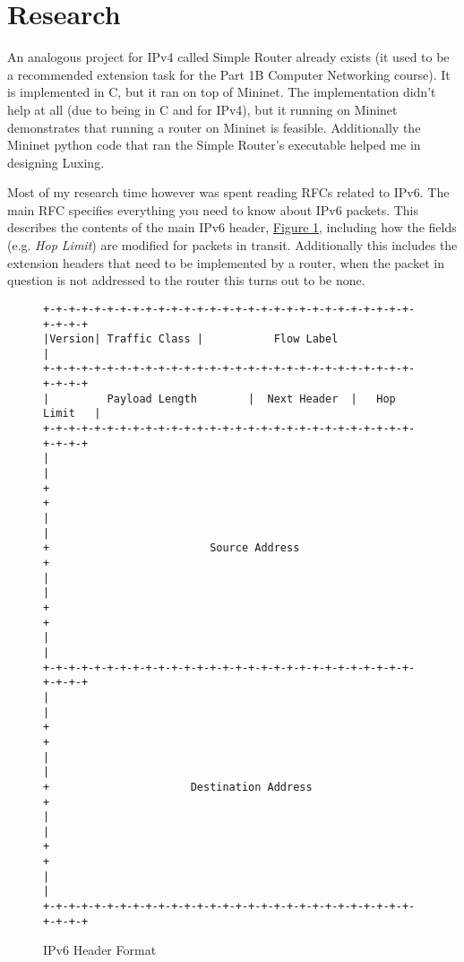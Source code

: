 \documentclass[12pt,a4paper,twoside,openright]{report}
\begin{document}
\section{Research}
An analogous project for IPv4 called Simple Router already exists\cite{simple_router} (it used to be a recommended extension task for the Part 1B Computer Networking course).  It is implemented in C, but it ran on top of Mininet.  The implementation didn't help at all (due to being in C and for IPv4), but it running on Mininet demonstrates that running a router on Mininet is feasible.  Additionally the Mininet python code that ran the Simple Router's executable helped me in designing Luxing.

\bigskip

Most of my research time however was spent reading RFCs related to IPv6.  The main RFC\cite{ipv6_rfc} specifies everything you need to know about IPv6 packets. This describes the contents of the main IPv6 header, \hyperref[fig::ipv6_header]{Figure }\ref{fig::ipv6_header}, including how the fields (e.g. \textit{Hop Limit}) are modified for packets in transit. Additionally this includes the extension headers that need to be implemented by a router, when the packet in question is not addressed to the router this turns out to be none. 

\begin{figure}
\centering
\begin{varwidth}{\linewidth}
\begin{verbatim}
+-+-+-+-+-+-+-+-+-+-+-+-+-+-+-+-+-+-+-+-+-+-+-+-+-+-+-+-+-+-+-+-+
|Version| Traffic Class |           Flow Label                  |
+-+-+-+-+-+-+-+-+-+-+-+-+-+-+-+-+-+-+-+-+-+-+-+-+-+-+-+-+-+-+-+-+
|         Payload Length        |  Next Header  |   Hop Limit   |
+-+-+-+-+-+-+-+-+-+-+-+-+-+-+-+-+-+-+-+-+-+-+-+-+-+-+-+-+-+-+-+-+
|                                                               |
+                                                               +
|                                                               |
+                         Source Address                        +
|                                                               |
+                                                               +
|                                                               |
+-+-+-+-+-+-+-+-+-+-+-+-+-+-+-+-+-+-+-+-+-+-+-+-+-+-+-+-+-+-+-+-+
|                                                               |
+                                                               +
|                                                               |
+                      Destination Address                      +
|                                                               |
+                                                               +
|                                                               |
+-+-+-+-+-+-+-+-+-+-+-+-+-+-+-+-+-+-+-+-+-+-+-+-+-+-+-+-+-+-+-+-+
\end{verbatim}
\end{varwidth}
\caption{IPv6 Header Format\cite{ipv6_rfc}}
\label{fig::ipv6_header}
\end{figure}
\end{document}
